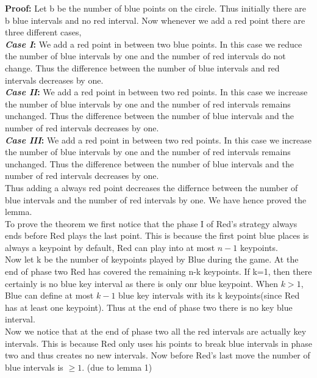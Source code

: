 \documentclass[12pt]{article}
\begin{document}
{ \bf Proof:} Let b be the number of blue points on the circle. Thus initially there are b blue intervals and no red interval. Now whenever we add a red point there are three different cases,\\

{ \bf \emph{Case I}:} We add a red point in between two blue points. In this case we reduce the number of blue intervals by one and the number of red intervals do not change. Thus the difference between the number of blue intervals and red intervals decreases by one.
\\

{ \bf \emph{Case II}:} We add a red point in between two red points. In this case we increase the number of blue intervals by one and the number of red intervals remains unchanged. Thus the difference between the number of blue intervals and the number of red intervals decreases by one.
\\

{ \bf \emph{Case III}:} We add a red point in between two red points. In this case we increase the number of blue intervals by one and the number of red intervals remains unchanged. Thus the difference between the number of blue intervals and the number of red intervals decreases by one.
\\

Thus adding a always red point decreases the differnce between the number of blue intervals and the number of red intervals by one. We have hence proved the lemma. 
\\

To prove the theorem we first notice that the phase I of Red's strategy always ends before Red plays the last point. This is because the first point blue places is always a keypoint by default, Red can play into at most $n-1$ keypoints. 
\\

Now let k be the number of keypoints played by Blue during the game. At the end of phase two Red has covered the remaining n-k keypoints. If k=1, then there certainly is no blue key interval as there is only onr blue keypoint. When $k > 1$, Blue can define at most $k-1$ blue key intervals with its k keypoints(since Red has at least one keypoint). Thus at the end of phase two there is no key blue interval. 
\\

Now we notice that at the end of phase two all the red intervals are actually key intervals. This is because Red only uses his points to break blue intervals in phase two and thus creates no new intervals. Now before Red's last move the number of blue intervals is $ \geq 1$. (due to lemma 1)
\\
\end{document}
